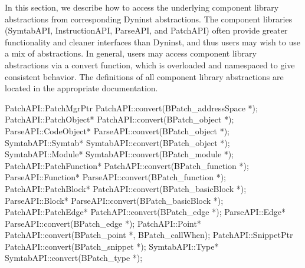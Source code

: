 In this section, we describe how to access the underlying component library abstractions from corresponding
Dyninst abstractions. The component libraries (SymtabAPI, InstructionAPI, ParseAPI, and PatchAPI) often
provide greater functionality and cleaner interfaces than Dyninst, and thus users may wish to use a mix
of abstractions. In general, users may access component library abstractions via a convert function, which
is overloaded and namespaced to give consistent behavior. The definitions of all component library
abstractions are located in the appropriate documentation.

\begin{apient}
  PatchAPI::PatchMgrPtr PatchAPI::convert(BPatch_addressSpace *);
  PatchAPI::PatchObject* PatchAPI::convert(BPatch_object *);
  ParseAPI::CodeObject* ParseAPI::convert(BPatch_object *);
  SymtabAPI::Symtab* SymtabAPI::convert(BPatch_object *);
  SymtabAPI::Module* SymtabAPI::convert(BPatch_module *);
  PatchAPI::PatchFunction* PatchAPI::convert(BPatch_function *);
  ParseAPI::Function* ParseAPI::convert(BPatch_function *);
  PatchAPI::PatchBlock* PatchAPI::convert(BPatch_basicBlock *);
  ParseAPI::Block* ParseAPI::convert(BPatch_basicBlock *);
  PatchAPI::PatchEdge* PatchAPI::convert(BPatch_edge *);
  ParseAPI::Edge* ParseAPI::convert(BPatch_edge *);
  PatchAPI::Point* PatchAPI::convert(BPatch_point *, BPatch_callWhen);
  PatchAPI::SnippetPtr PatchAPI::convert(BPatch_snippet *);
  SymtabAPI::Type* SymtabAPI::convert(BPatch_type *);
\end{apient}
